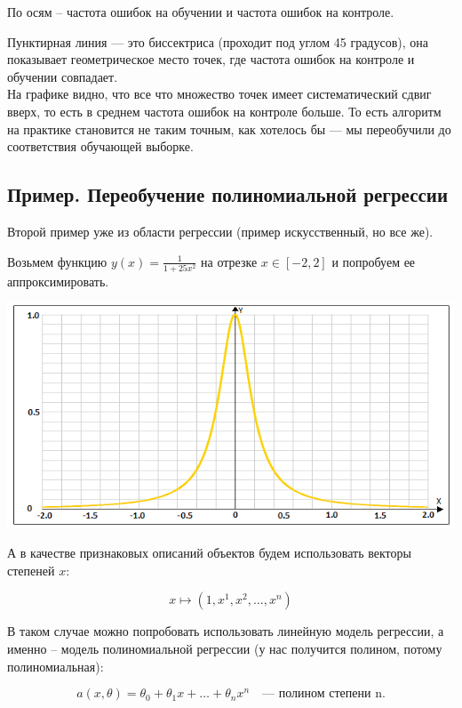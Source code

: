 \documentclass{article}
\begin{document}
По осям -- частота ошибок на обучении и частота ошибок на контроле.

Пунктирная линия --- это биссектриса (проходит под углом 45 градусов), она показывает геометрическое место точек, где частота ошибок на контроле и обучении совпадает.
\\

На графике видно, что все что множество точек имеет систематический сдвиг вверх, то есть в среднем частота ошибок на контроле больше. То есть алгоритм на практике становится не таким точным, как хотелось бы --- мы переобучили до соответствия обучающей выборке.
\\

\subsection{Пример. Переобучение полиномиальной регрессии}

Второй пример уже из области регрессии (пример искусственный, но все же).

Возьмем функцию $y(x) = \frac{1}{1 + 25 x^2}$ на отрезке $x \in [-2, 2]$ и попробуем ее аппроксимировать.

\begin{center}
    \includegraphics[scale=0.8]{2_2.png}
\end{center}

А в качестве признаковых описаний объектов будем использовать векторы степеней $x$:

$$x \mapsto (1, x^1, x^2, \ldots, x^n)$$

В таком случае можно попробовать использовать линейную модель регрессии, а именно -- модель полиномиальной регрессии (у нас получится полином, потому полиномиальная):

$$a(x, \theta) = \theta_0 + \theta_1 x + \ldots + \theta_n x^n
\quad\text{--- полином степени n.}$$
\end{document}
